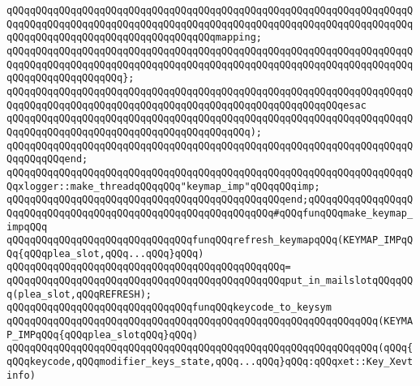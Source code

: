 \newline
\verb|qQQqqQQqqQQqqQQqqQQqqQQqqQQqqQQqqQQqqQQqqQQqqQQqqQQqqQQqqQQqqQQqqQQqqQQqqQQqqQQqqQQqqQQqqQQqqQQqqQQqqQQqqQQqqQQqqQQqqQQqqQQqqQQqqQQqqQQqqQQqqQQqqQQqqQQqqQQqqQQqqQQqqQQqqQQqqQQqmapping;|\newline
\verb|qQQqqQQqqQQqqQQqqQQqqQQqqQQqqQQqqQQqqQQqqQQqqQQqqQQqqQQqqQQqqQQqqQQqqQQqqQQqqQQqqQQqqQQqqQQqqQQqqQQqqQQqqQQqqQQqqQQqqQQqqQQqqQQqqQQqqQQqqQQqqQQqqQQqqQQqqQQqqQQq};|\newline
\verb|qQQqqQQqqQQqqQQqqQQqqQQqqQQqqQQqqQQqqQQqqQQqqQQqqQQqqQQqqQQqqQQqqQQqqQQqqQQqqQQqqQQqqQQqqQQqqQQqqQQqqQQqqQQqqQQqqQQqqQQqqQQqqQQqesac|\newline
\verb|qQQqqQQqqQQqqQQqqQQqqQQqqQQqqQQqqQQqqQQqqQQqqQQqqQQqqQQqqQQqqQQqqQQqqQQqqQQqqQQqqQQqqQQqqQQqqQQqqQQqqQQqqQQqqQQq);|\newline
\newline
\verb|qQQqqQQqqQQqqQQqqQQqqQQqqQQqqQQqqQQqqQQqqQQqqQQqqQQqqQQqqQQqqQQqqQQqqQQqqQQqqQQqend;|\newline
\newline
\verb|qQQqqQQqqQQqqQQqqQQqqQQqqQQqqQQqqQQqqQQqqQQqqQQqqQQqqQQqqQQqqQQqqQQqqQQqxlogger::make_threadqQQqqQQq"keymap_imp"qQQqqQQqimp;|\newline
\newline
\verb|qQQqqQQqqQQqqQQqqQQqqQQqqQQqqQQqqQQqqQQqqQQqqQQqend;qQQqqQQqqQQqqQQqqQQqqQQqqQQqqQQqqQQqqQQqqQQqqQQqqQQqqQQqqQQqqQQq#qQQqfunqQQqmake_keymap_impqQQq|\newline
\newline
\newline
\verb|qQQqqQQqqQQqqQQqqQQqqQQqqQQqqQQqfunqQQqrefresh_keymapqQQq(KEYMAP_IMPqQQq{qQQqplea_slot,qQQq...qQQq}qQQq)|\newline
\verb|qQQqqQQqqQQqqQQqqQQqqQQqqQQqqQQqqQQqqQQqqQQqqQQq=|\newline
\verb|qQQqqQQqqQQqqQQqqQQqqQQqqQQqqQQqqQQqqQQqqQQqqQQqput_in_mailslotqQQqqQQq(plea_slot,qQQqREFRESH);|\newline
\newline
\newline
\verb|qQQqqQQqqQQqqQQqqQQqqQQqqQQqqQQqfunqQQqkeycode_to_keysym|\newline
\verb|qQQqqQQqqQQqqQQqqQQqqQQqqQQqqQQqqQQqqQQqqQQqqQQqqQQqqQQqqQQqqQQq(KEYMAP_IMPqQQq{qQQqplea_slotqQQq}qQQq)|\newline
\verb|qQQqqQQqqQQqqQQqqQQqqQQqqQQqqQQqqQQqqQQqqQQqqQQqqQQqqQQqqQQqqQQq(qQQq{qQQqkeycode,qQQqmodifier_keys_state,qQQq...qQQq}qQQq:qQQqxet::Key_Xevtinfo)|\newline
